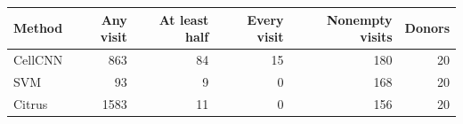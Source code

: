 \begin{tabular}{lrrrrr}
\toprule
Method & Any visit & At least half & Every visit & Nonempty visits & Donors \\
\midrule
CellCNN & 863 & 84 & 15 & 180 & 20 \\
SVM & 93 & 9 & 0 & 168 & 20 \\
Citrus & 1583 & 11 & 0 & 156 & 20 \\
\bottomrule
\end{tabular}
